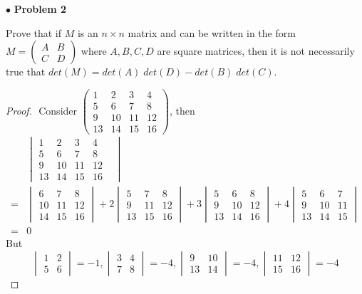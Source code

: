 \documentclass{article}
\begin{document}
$ \bullet$ \textbf{Problem 2}
\medskip

\begin{itshape}
Prove that if $M$ is an $n \times n$ matrix and can be written in the form $M= \begin{pmatrix} A & B \\ C & D \end{pmatrix}$ where $A,B,C,D$ are square matrices, then it is not necessarily true that $det(M) = det(A) \; det(D) - det(B) \; det(C)$.
\end{itshape}
\medskip

\begin{proof}
$ $\newline
Consider $\begin{pmatrix} 1 & 2& 3&4 \\ 5&6&7&8 \\9&10&11&12\\ 13&14&15&16 \end{pmatrix}$, then
\begin{align*}
&\begin{vmatrix} 1 & 2& 3&4 \\ 5&6&7&8& \\9&10&11&12\\ 13&14&15&16 \end{vmatrix} \\
=& \begin{vmatrix} 6&7&8 \\ 10&11&12 \\14&15&16 \end{vmatrix} + 2\begin{vmatrix}5&7&8\\ 9&11&12 \\13&15&16\end{vmatrix} + 3\begin{vmatrix} 5&6&8\\9&10&12\\13&14&16\end{vmatrix} + 4\begin{vmatrix} 5&6&7\\9&10&11\\13&14&15\end{vmatrix} \\
=& 0
\end{align*}
But
$$\begin{vmatrix} 1&2\\5&6\end{vmatrix} = -1, \begin{vmatrix} 3 & 4 \\ 7&8 \end{vmatrix} = -4, \begin{vmatrix} 9&10 \\ 13&14\end{vmatrix} = -4, \begin{vmatrix} 11&12 \\ 15&16 \end{vmatrix} = -4$$

\end{proof}
\end{document}
